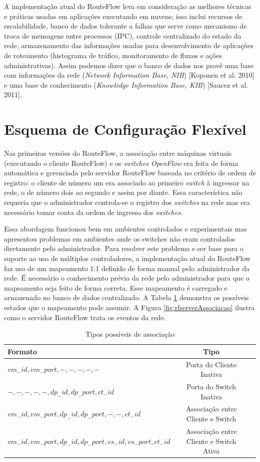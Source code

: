 A implementação atual do RouteFlow leva em consideração
as melhores técnicas e práticas usadas em aplicações executando
em nuvens; isso inclui recursos de escalabilidade, banco de 
dados tolerante a falhas que serve como mecanismo de troca
de mensagens entre processos (IPC), controle centralizado
do estado da rede, armazenamento das informações usadas 
para desenvolvimento de aplicações de roteamento (histograma 
de tráfico, monitoramento de fluxos e ações administrativas).
Assim podemos dizer que o banco de dados nos provê uma 
base com informações da rede (\textit{Network Information
Base, NIB}) [Koponen et al. 2010] e uma base de conhecimento
 (\textit{Knowledge Information Base, KIB}) [Saucez et al. 2011].

\section{Esquema de Configuração Flexível}

Nas primeiras versões do RouteFlow, a associação entre máquinas
virtuais (executando o cliente RouteFlow) e os \textit{switches OpenFlow}
era feita de forma automática e gerenciada pelo servidor RouteFlow baseada
no critério de ordem de registro: o cliente de número um
era associado ao primeiro \textit{switch} à ingressar na rede, o de número
dois ao segundo e assim por diante. Essa característica não requeria 
que o administrador controla-se o registro dos \textit{switches} na rede mas
era necessário tomar conta da ordem de ingresso dos \textit{switches}.

Essa abordagem funcionou bem em ambientes controlados e 
experimentais mas apresentou problemas em ambientes onde
os switches não eram controlados diretamente pelo administrador.
Para resolver este problema e ser base para o suporte ao uso de
múltiplos controladores, a implementação atual do RouteFlow
faz uso de um mapeamento 1:1 definido de forma manual pelo 
administrador da rede.
É necessário o conhecimento prévio da rede pelo administrador
para que o mapeamento seja feito de forma correta. Esse mapeamento
é carregado e armazenado no banco de dados centralizado.
A Tabela \ref{tab:tipos_associacao} demonstra os possíveis estados que o mapeamento
pode assumir. A Figura \ref{fig:rfserverAssociacao} ilustra como o servidor RouteFlow trata os eventos
da rede.


\begin{table}[h]
\centering
\begin{tabular}{|l|c|c|}
\hline
Formato & Tipo\\
\hline
\hline
$vm_-id,vm_-port,-,-,-,-,-$ & Porta do Cliente Inativa\\
\hline
$-,-,-,-,-,dp_-id,dp_-port,ct_-id$ & Porta do Switch Inativa\\
\hline
$vm_-id,vm_-port,dp_-id,dp_-port,-,-,ct_-id$ & Associação entre Cliente e Switch\\
\hline
$vm_-id,vm_-port,dp_-id,dp_-port,vs_-id,vs_-port,ct_-id$ & Associação entre Cliente e Switch Ativa\\
\hline
\end{tabular}
\caption{Tipos possíveis de associação}
\label{tab:tipos_associacao}
\end{table}


